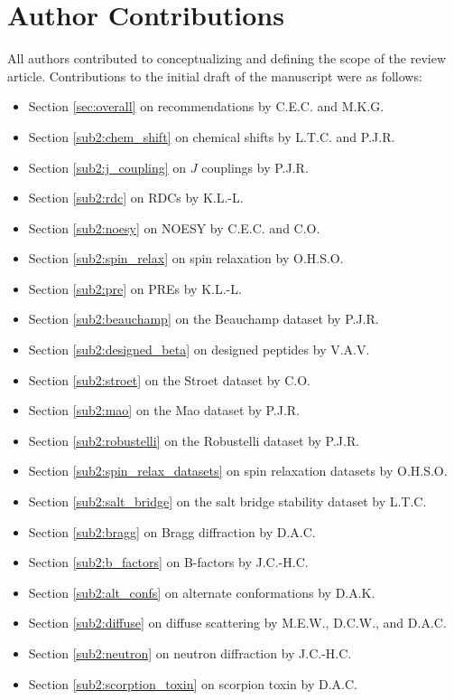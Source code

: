 \documentclass[9pt,review,pubversion]{livecoms}
\begin{document}
\section*{Author Contributions}

All authors contributed to conceptualizing and defining the scope of the review article.
Contributions to the initial draft of the manuscript were as follows:
\begin{itemize}
    \item Section \ref{sec:overall} on recommendations by C.E.C. and M.K.G.
    \item Section \ref{sub2:chem_shift} on chemical shifts by L.T.C. and P.J.R.
    \item Section \ref{sub2:j_coupling} on $J$ couplings by P.J.R.
    \item Section \ref{sub2:rdc} on RDCs by K.L.-L.
    \item Section \ref{sub2:noesy} on NOESY by C.E.C. and C.O.
    \item Section \ref{sub2:spin_relax} on spin relaxation by O.H.S.O.
    \item Section \ref{sub2:pre} on PREs by K.L.-L.
    \item Section \ref{sub2:beauchamp} on the Beauchamp dataset by P.J.R.
    \item Section \ref{sub2:designed_beta} on designed peptides by V.A.V.
    \item Section \ref{sub2:stroet} on the Stroet dataset by C.O.
    \item Section \ref{sub2:mao} on the Mao dataset by P.J.R.
    \item Section \ref{sub2:robustelli} on the Robustelli dataset by P.J.R.
    \item Section \ref{sub2:spin_relax_datasets} on spin relaxation datasets by O.H.S.O.
    \item Section \ref{sub2:salt_bridge} on the salt bridge stability dataset by L.T.C.
    \item Section \ref{sub2:bragg} on Bragg diffraction by D.A.C.
    \item Section \ref{sub2:b_factors} on B-factors by J.C.-H.C.
    \item Section \ref{sub2:alt_confs} on alternate conformations by D.A.K.
    \item Section \ref{sub2:diffuse} on diffuse scattering by M.E.W., D.C.W., and D.A.C.
    \item Section \ref{sub2:neutron} on neutron diffraction by J.C.-H.C.
    \item Section \ref{sub2:scorption_toxin} on scorpion toxin by D.A.C.

\end{itemize}
\end{document}
